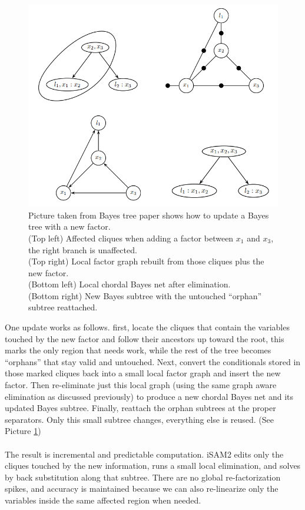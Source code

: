 \begin{figure}[H]
    \centering
    \includegraphics[width=0.98\linewidth]{Pictures/Optimizers/iSAM2/updating_Bayes_tree.png}
    \caption{Picture taken from Bayes tree paper \cite{Bayes_tree_for_SLAM_paper} shows how to update a Bayes tree with a new factor. \\ \noindent 
    (Top left) Affected cliques when adding a factor between $x_1$ and $x_3$, the right branch is unaffected. \\ \noindent
    (Top right) Local factor graph rebuilt from those cliques plus the new factor. \\ \noindent
    (Bottom left) Local chordal Bayes net after elimination. \\ \noindent
    (Bottom right) New Bayes subtree with the untouched ``orphan'' subtree reattached.}
    \label{fig:optimizer-iSAM2-R-update-tree}
\end{figure}
\noindent
One update works as follows. first, locate the cliques that contain the variables touched by the new factor and follow their ancestors up toward the root, this marks the only region that needs work, while the rest of the tree becomes ``orphans'' that stay valid and untouched. Next, convert the conditionals stored in those marked cliques back into a small local factor graph and insert the new factor. Then re-eliminate just this local graph (using the same graph aware elimination as discussed previously) to produce a new chordal Bayes net and its updated Bayes subtree. Finally, reattach the orphan subtrees at the proper separators. Only this small subtree changes, everything else is reused. (See Picture \ref{fig:optimizer-iSAM2-R-update-tree})
\\ \\
The result is incremental and predictable computation. \gls{iSAM}2 edits only the cliques touched by the new information, runs a small local elimination, and solves by back substitution along that subtree. There are no global re-factorization spikes, and accuracy is maintained because we can also re-linearize only the variables inside the same affected region when needed.




